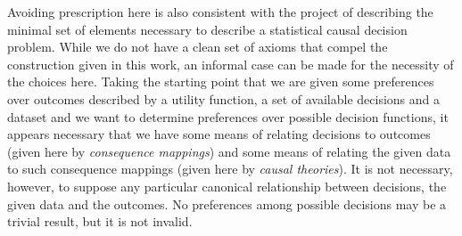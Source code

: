 Avoiding prescription here is also consistent with the project of describing the minimal set of elements necessary to describe a statistical causal decision problem. While we do not have a clean set of axioms that compel the construction given in this work, an informal case can be made for the necessity of the choices here. Taking the starting point that we are given some preferences over outcomes described by a utility function, a set of available decisions and a dataset and we want to determine preferences over possible decision functions, it appears necessary that we have some means of relating decisions to outcomes (given here by \emph{consequence mappings}) and some means of relating the given data to such consequence mappings (given here by \emph{causal theories}). It is not necessary, however, to suppose any particular canonical relationship between decisions, the given data and the outcomes. No preferences among possible decisions may be a trivial result, but it is not invalid.
